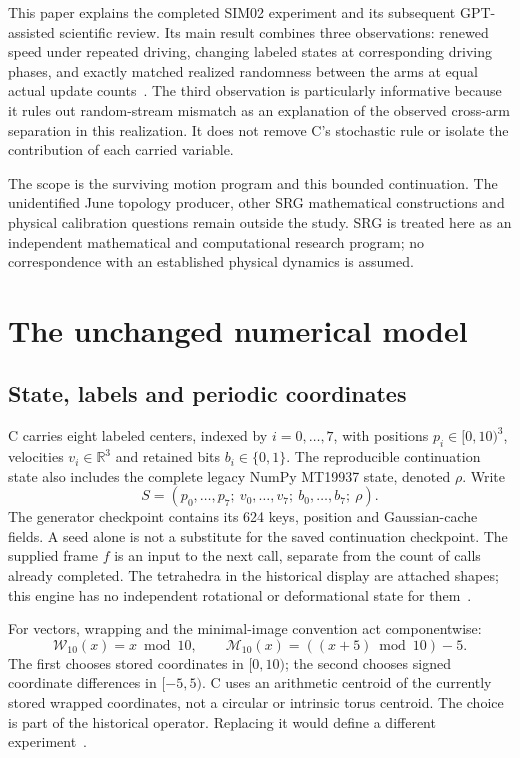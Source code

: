 \documentclass[11pt,a4paper]{article}
\newcommand{\mi}{\mathcal M_{10}}
\newcommand{\wrap}{\mathcal W_{10}}
\begin{document}
This paper explains the completed SIM02 experiment and its subsequent GPT-assisted scientific review. Its main result combines three observations: renewed speed under repeated driving, changing labeled states at corresponding driving phases, and exactly matched realized randomness between the arms at equal actual update counts~\cite{sim02,review}. The third observation is particularly informative because it rules out random-stream mismatch as an explanation of the observed cross-arm separation in this realization. It does not remove C's stochastic rule or isolate the contribution of each carried variable.

The scope is the surviving motion program and this bounded continuation. The unidentified June topology producer, other SRG mathematical constructions and physical calibration questions remain outside the study. SRG is treated here as an independent mathematical and computational research program; no correspondence with an established physical dynamics is assumed.

\section{The unchanged numerical model}
\label{sec:model}
\subsection{State, labels and periodic coordinates}
C carries eight labeled centers, indexed by $i=0,\ldots,7$, with positions $p_i\in[0,10)^3$, velocities $v_i\in\mathbb R^3$ and retained bits $b_i\in\{0,1\}$. The reproducible continuation state also includes the complete legacy NumPy MT19937 state, denoted $\rho$. Write
\begin{equation}
 S=(p_0,\ldots,p_7;\ v_0,\ldots,v_7;\ b_0,\ldots,b_7;\ \rho).
 \label{eq:state}
\end{equation}
The generator checkpoint contains its 624 keys, position and Gaussian-cache fields. A seed alone is not a substitute for the saved continuation checkpoint. The supplied frame $f$ is an input to the next call, separate from the count of calls already completed. The tetrahedra in the historical display are attached shapes; this engine has no independent rotational or deformational state for them~\cite{sim01,source}.

For vectors, wrapping and the minimal-image convention act componentwise:
\begin{equation}
 \wrap(x)=x\bmod 10,\qquad \mi(x)=((x+5)\bmod10)-5.
 \label{eq:wrap}
\end{equation}
The first chooses stored coordinates in $[0,10)$; the second chooses signed coordinate differences in $[-5,5)$. C uses an arithmetic centroid of the currently stored wrapped coordinates, not a circular or intrinsic torus centroid. The choice is part of the historical operator. Replacing it would define a different experiment~\cite{source}.
\end{document}
